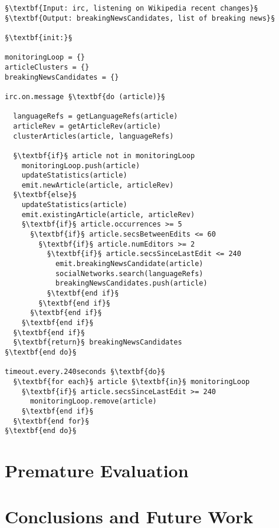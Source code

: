 \documentclass{sig-alternate}
\begin{document}
\begin{lstlisting}[caption=Pseudocode of the cluster visual representative selection algorithm that finds the highest quality media item of a~cluster,
  label=code:pseudocode, float]
§\textbf{Input: irc, listening on Wikipedia recent changes}§ 
§\textbf{Output: breakingNewsCandidates, list of breaking news}§ 

§\textbf{init:}§

monitoringLoop = {}
articleClusters = {}
breakingNewsCandidates = {}
  
irc.on.message §\textbf{do (article)}§

  languageRefs = getLanguageRefs(article)
  articleRev = getArticleRev(article)
  clusterArticles(article, languageRefs)  
  
  §\textbf{if}§ article not in monitoringLoop
    monitoringLoop.push(article)
    updateStatistics(article)
    emit.newArticle(article, articleRev)    
  §\textbf{else}§
    updateStatistics(article)
    emit.existingArticle(article, articleRev)
    §\textbf{if}§ article.occurrences >= 5
      §\textbf{if}§ article.secsBetweenEdits <= 60      
        §\textbf{if}§ article.numEditors >= 2
          §\textbf{if}§ article.secsSinceLastEdit <= 240
            emit.breakingNewsCandidate(article)
            socialNetworks.search(languageRefs)
            breakingNewsCandidates.push(article)
          §\textbf{end if}§          
        §\textbf{end if}§  
      §\textbf{end if}§        
    §\textbf{end if}§          
  §\textbf{end if}§
  §\textbf{return}§ breakingNewsCandidates
§\textbf{end do}§

timeout.every.240seconds §\textbf{do}§
  §\textbf{for each}§ article §\textbf{in}§ monitoringLoop
    §\textbf{if}§ article.secsSinceLastEdit >= 240
      monitoringLoop.remove(article)
    §\textbf{end if}§
  §\textbf{end for}§ 
§\textbf{end do}§
\end{lstlisting}

\section{Premature Evaluation}

\section{Conclusions and Future Work}




\balancecolumns
\end{document}
